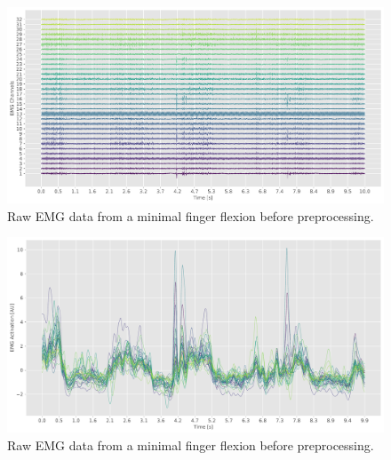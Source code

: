 \documentclass[
  a4paper,
]{article}
\makeatletter
\newcounter{figno}
\newenvironment{fignos:no-prefix-figure-caption}{
  \caption@ifcompatibility{}{
    \let\oldthefigure\thefigure
    \let\oldtheHfigure\theHfigure
    \renewcommand{\thefigure}{figno:\thefigno}
    \renewcommand{\theHfigure}{figno:\thefigno}
    \stepcounter{figno}
    \captionsetup{labelformat=empty}
  }
}{
  \caption@ifcompatibility{}{
    \captionsetup{labelformat=default}
    \let\thefigure\oldthefigure
    \let\theHfigure\oldtheHfigure
    \addtocounter{figure}{-1}
  }
}
\makeatother
\begin{document}
\begin{fignos:no-prefix-figure-caption}

\begin{figure}
\centering
\includegraphics{images/data_analysis/fingers/raw_data.pdf}
\caption{Raw EMG data from a minimal finger flexion before
preprocessing.}
\end{figure}

\end{fignos:no-prefix-figure-caption}

\begin{fignos:no-prefix-figure-caption}

\begin{figure}
\centering
\includegraphics{images/data_analysis/fingers/preprocessed_data.pdf}
\caption{Raw EMG data from a minimal finger flexion before
preprocessing.}
\end{figure}

\end{fignos:no-prefix-figure-caption}
\end{document}
